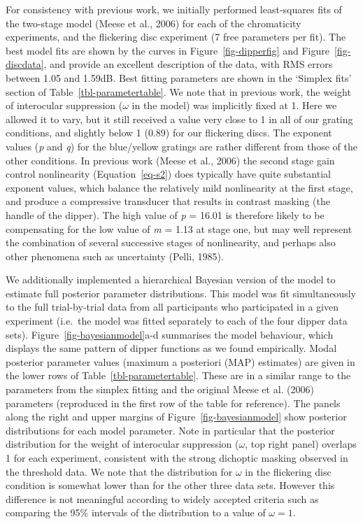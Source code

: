 \documentclass[
  letterpaper,
  DIV=11,
  numbers=noendperiod]{scrartcl}
\begin{document}
For consistency with previous work, we initially performed least-squares
fits of the two-stage model (Meese et al., 2006) for each of the
chromaticity experiments, and the flickering disc experiment (7 free
parameters per fit). The best model fits are shown by the curves in
Figure~\ref{fig-dipperfig} and Figure~\ref{fig-discdata}, and provide an
excellent description of the data, with RMS errors between 1.05 and
1.59dB. Best fitting parameters are shown in the `Simplex fits' section
of Table~\ref{tbl-parametertable}. We note that in previous work, the
weight of interocular suppression (\(\omega\) in the model) was
implicitly fixed at 1. Here we allowed it to vary, but it still received
a value very close to 1 in all of our grating conditions, and slightly
below 1 (0.89) for our flickering discs. The exponent values (\emph{p}
and \emph{q}) for the blue/yellow gratings are rather different from
those of the other conditions. In previous work (Meese et al., 2006) the
second stage gain control nonlinearity (Equation~\ref{eq-s2}) does
typically have quite substantial exponent values, which balance the
relatively mild nonlinearity at the first stage, and produce a
compressive transducer that results in contrast masking (the handle of
the dipper). The high value of \emph{p} = 16.01 is therefore likely to
be compensating for the low value of \emph{m} = 1.13 at stage one, but
may well represent the combination of several successive stages of
nonlinearity, and perhaps also other phenomena such as uncertainty
(Pelli, 1985).

We additionally implemented a hierarchical Bayesian version of the model
to estimate full posterior parameter distributions. This model was fit
simultaneously to the full trial-by-trial data from all participants who
participated in a given experiment (i.e.~the model was fitted separately
to each of the four dipper data sets). Figure~\ref{fig-bayesianmodel}a-d
summarises the model behaviour, which displays the same pattern of
dipper functions as we found empirically. Modal posterior parameter
values (maximum a posteriori (MAP) estimates) are given in the lower
rows of Table~\ref{tbl-parametertable}. These are in a similar range to
the parameters from the simplex fitting and the original Meese et al.
(2006) parameters (reproduced in the first row of the table for
reference). The panels along the right and upper margins of
Figure~\ref{fig-bayesianmodel} show posterior distributions for each
model parameter. Note in particular that the posterior distribution for
the weight of interocular suppression (\(\omega\), top right panel)
overlaps 1 for each experiment, consistent with the strong dichoptic
masking observed in the threshold data. We note that the distribution
for \(\omega\) in the flickering disc condition is somewhat lower than
for the other three data sets. However this difference is not meaningful
according to widely accepted criteria such as comparing the 95\%
intervals of the distribution to a value of \(\omega=1\).
\end{document}
